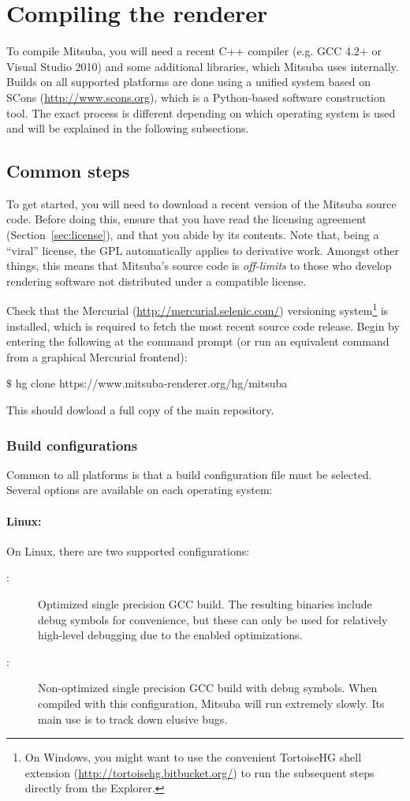 \section{Compiling the renderer}
\label{sec:compiling}
To compile Mitsuba, you will need a recent C++ compiler (e.g. GCC 4.2+ or
Visual Studio 2010) and some additional libraries, which Mitsuba uses internally.
Builds on all supported platforms are done using a unified system
based on SCons (\url{http://www.scons.org}), which is a Python-based
software construction tool. The exact process is different depending on
which operating system is used and will be explained in the following subsections.

\subsection{Common steps}
To get started, you will need to download a recent version of the Mitsuba source code. Before
doing this, ensure that you have read the licensing agreement
(Section~\ref{sec:license}), and that you abide by its contents. Note that, being a ``viral''
license, the GPL automatically applies to derivative work. Amongst other things, this
means that Mitsuba's source code is \emph{off-limits} to those who develop rendering
software not distributed under a compatible license.

Check that the Mercurial (\url{http://mercurial.selenic.com/}) versioning
system\footnote{On Windows, you might want to use the convenient TortoiseHG shell
extension (\url{http://tortoisehg.bitbucket.org/}) to run the subsequent steps directly from the Explorer.}
is installed, which is required to fetch the most recent source code release.
Begin by entering the following at the command prompt (or run an equivalent command from a graphical Mercurial frontend):
\begin{shell}
$\texttt{\$}$ hg clone https://www.mitsuba-renderer.org/hg/mitsuba
\end{shell}
This should dowload a full copy of the main repository.

\subsubsection{Build configurations}
Common to all platforms is that a build configuration file must be selected. Several options are
available on each operating system:
\paragraph{Linux:}
On Linux, there are two supported configurations:
\begin{description}
\item[:] Optimized single precision GCC build. The resulting binaries include debug symbols for convenience, but these can only be used for relatively high-level debugging due to the enabled optimizations.
\item[:] Non-optimized single precision GCC build with debug symbols. When compiled with this configuration, Mitsuba
will run extremely slowly. Its main use is to track down elusive bugs.
\end{description}
